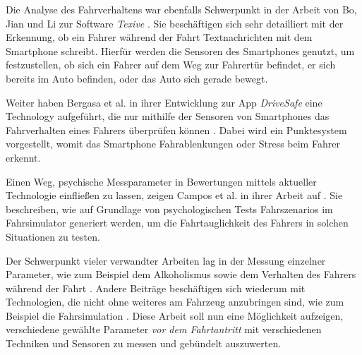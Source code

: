 Die Analyse des Fahrverhaltens war ebenfalls Schwerpunkt in der Arbeit von Bo, Jian und Li zur Software \textit{Texive} \cite{texive}. Sie beschäftigen sich sehr detailliert mit der Erkennung, ob ein Fahrer während der Fahrt Textnachrichten mit dem Smartphone schreibt. Hierfür werden die Sensoren des Smartphones genutzt, um festzustellen, ob sich ein Fahrer auf dem Weg zur Fahrertür befindet, er sich bereits im Auto befinden, oder das Auto sich gerade bewegt.

Weiter haben Bergasa et al. in ihrer Entwicklung zur App \textit{DriveSafe} eine Technology aufgeführt, die nur mithilfe der Sensoren von Smartphones das Fahrverhalten eines Fahrers überprüfen können \cite{drivesafe}. Dabei wird ein Punktesystem vorgestellt, womit das Smartphone Fahrablenkungen oder Stress beim Fahrer erkennt.

Einen Weg, psychische Messparameter in Bewertungen mittels aktueller Technologie einfließen zu lassen, zeigen Campos et al. in ihrer Arbeit auf \cite{drivingsimulations}. Sie beschreiben, wie auf Grundlage von psychologischen Tests Fahrszenarios im Fahrsimulator generiert werden, um die Fahrtauglichkeit des Fahrers in solchen Situationen zu testen.

Der Schwerpunkt vieler verwandter Arbeiten lag in der Messung einzelner Parameter, wie zum Beispiel dem Alkoholismus \cite{mobilesmarttracking,sobrietymobiletests} sowie dem Verhalten des Fahrers während der Fahrt \cite{smartphoneresearchplatform, texive, drivesafe}. Andere Beiträge beschäftigen sich wiederum mit Technologien, die nicht ohne weiteres am Fahrzeug anzubringen sind, wie zum Beispiel die Fahrsimulation \cite{drivingsimulations, interaktivefahrsimulation}.  Diese Arbeit soll nun eine Möglichkeit aufzeigen, verschiedene gewählte Parameter \textit{vor dem Fahrtantritt} mit verschiedenen Techniken und Sensoren zu messen und gebündelt auszuwerten.
